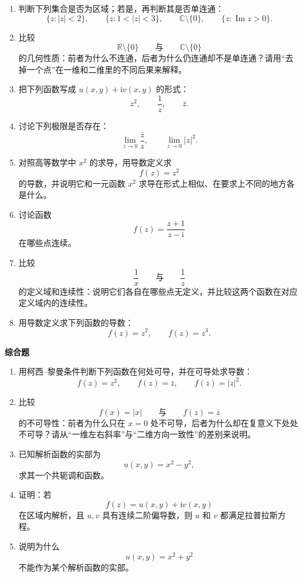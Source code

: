 \begin{enumerate}
    \item 判断下列集合是否为区域；若是，再判断其是否单连通：
    \[
        \{z:|z|<2\},\qquad \{z:1<|z|<3\},\qquad \mathbb{C}\setminus\{0\},\qquad \{z:\operatorname{Im}z>0\}.
    \]

    \item 比较
    \[
        \mathbb{R}\setminus\{0\}\qquad \text{与}\qquad \mathbb{C}\setminus\{0\}
    \]
    的几何性质：前者为什么不连通，后者为什么仍连通却不是单连通？请用``去掉一个点''在一维和二维里的不同后果来解释。

    \item 把下列函数写成 $u(x,y)+\mathrm{i}v(x,y)$ 的形式：
    \[
        z^2,\qquad \frac{1}{z},\qquad \bar z.
    \]

    \item 讨论下列极限是否存在：
    \[
        \lim_{z\to 0}\frac{\bar z}{z},\qquad
        \lim_{z\to 0}|z|^2.
    \]

    \item 对照高等数学中 $x^2$ 的求导，用导数定义求
    \[
        f(z)=z^2
    \]
    的导数，并说明它和一元函数 $x^2$ 求导在形式上相似、在要求上不同的地方各是什么。

    \item 讨论函数
    \[
        f(z)=\frac{z+1}{z-\mathrm{i}}
    \]
    在哪些点连续。

    \item 比较
    \[
        \frac{1}{x}\qquad \text{与}\qquad \frac{1}{z}
    \]
    的定义域和连续性：说明它们各自在哪些点无定义，并比较这两个函数在对应定义域内的连续性。

    \item 用导数定义求下列函数的导数：
    \[
        f(z)=z^2,\qquad f(z)=z^3.
    \]
\end{enumerate}

\textbf{综合题}

\begin{enumerate}[resume]
    \item 用柯西--黎曼条件判断下列函数在何处可导，并在可导处求导数：
    \[
        f(z)=z^2,\qquad f(z)=\bar z,\qquad f(z)=|z|^2.
    \]

    \item 比较
    \[
        f(x)=|x|\qquad \text{与}\qquad f(z)=\bar z
    \]
    的不可导性：前者为什么只在 $x=0$ 处不可导，后者为什么却在复意义下处处不可导？请从``一维左右斜率''与``二维方向一致性''的差别来说明。

    \item 已知解析函数的实部为
    \[
        u(x,y)=x^2-y^2,
    \]
    求其一个共轭调和函数。

    \item 证明：若
    \[
        f(z)=u(x,y)+\mathrm{i}v(x,y)
    \]
    在区域内解析，且 $u,v$ 具有连续二阶偏导数，则 $u$ 和 $v$ 都满足拉普拉斯方程。

    \item 说明为什么
    \[
        u(x,y)=x^2+y^2
    \]
    不能作为某个解析函数的实部。
\end{enumerate}

